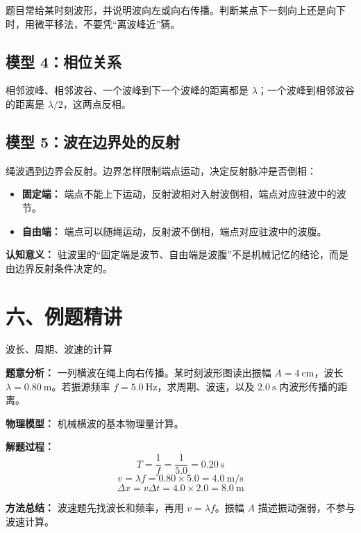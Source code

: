 题目常给某时刻波形，并说明波向左或向右传播。判断某点下一刻向上还是向下时，用微平移法，不要凭“离波峰近”猜。

\subsection*{模型 4：相位关系}

相邻波峰、相邻波谷、一个波峰到下一个波峰的距离都是 $\lambda$；一个波峰到相邻波谷的距离是 $\lambda/2$，这两点反相。

\subsection*{模型 5：波在边界处的反射}

绳波遇到边界会反射。边界怎样限制端点运动，决定反射脉冲是否倒相：

\pagebreak
\begin{center}


\label{fig:wave-reflection-boundary}
\end{center}

\begin{itemize}
  \item \textbf{固定端：} 端点不能上下运动，反射波相对入射波倒相，端点对应驻波中的波节。
  \item \textbf{自由端：} 端点可以随绳运动，反射波不倒相，端点对应驻波中的波腹。
\end{itemize}

\textbf{认知意义：} 驻波里的“固定端是波节、自由端是波腹”不是机械记忆的结论，而是由边界反射条件决定的。

\section*{六、例题精讲}

\begin{examplebox}{波长、周期、波速的计算}

\textbf{题意分析：} 一列横波在绳上向右传播。某时刻波形图读出振幅 $A=4\ \mathrm{cm}$，波长 $\lambda=0.80\ \mathrm{m}$。若振源频率 $f=5.0\ \mathrm{Hz}$，求周期、波速，以及 $2.0\ \mathrm{s}$ 内波形传播的距离。

\begin{center}


\label{fig:wave-example-basic}
\end{center}

\textbf{物理模型：} 机械横波的基本物理量计算。

\textbf{解题过程：}
\[
T=\frac{1}{f}=\frac{1}{5.0}=0.20\ \mathrm{s}
\]
\[
v=\lambda f=0.80\times 5.0=4.0\ \mathrm{m/s}
\]
\[
\Delta x=v\Delta t=4.0\times 2.0=8.0\ \mathrm{m}
\]

\textbf{方法总结：} 波速题先找波长和频率，再用 $v=\lambda f$。振幅 $A$ 描述振动强弱，不参与波速计算。

\end{examplebox}

